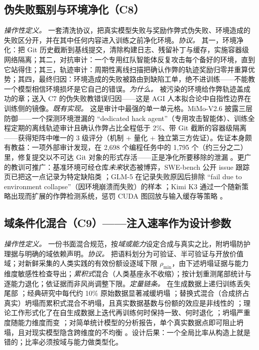 \documentclass[10pt,fontset=fandol]{ctexart}
\begin{document}
\subsection{伪失败甄别与环境净化（C8）}

\emph{操作性定义。} 一套清洗协议，把真实模型失败与奖励作弊式伪失败、环境造成的失败区分开，并在其中任何内容进入训练之前净化环境。\emph{协议。} 其一，环境净化：把 Git 历史截断到基线提交，清除构建日志、残留补丁与缓存，实施容器级网络隔离；其二，对抗审计：一个专用红队智能体反复攻击每个备好的环境，直到它站得住；其三，轨迹审计：周期性离线扫描把确认作弊的轨迹奖励归零并重算优势；其四，最终归因：环境造成的失败被路由到缺陷工单，绝不进训练——不能教一个模型相信环境损坏是它自己的错误。\emph{为什么。} 被污染的环境给作弊轨迹盖成功的章；送入 C7 的伪失败教错误归因——这是 AGI 人本拟合论中自指性边界在训练侧的镜像。\emph{既有实现。} 这是审计中最强的单一单元格。MiMo-V2.6 披露三层防御——一个探测环境泄漏的 ``dedicated hack agent''（专用攻击智能体）、训练全程定期的离线轨迹审计且确认作弊占比全程低于 2\%、带 Git 截断的容器级隔离 \cite{ref26}——获得矩阵中唯一的 3 级评分（机制 + 量化 + 独立第三方佐证）。佐证本身颇有教益：一项外部审计发现，在 2,698 个编程任务中的 1,795 个（约三分之二）里，修复提交以不可达 Git 对象的形式存活——正是净化所要移除的泄漏 \cite{ref29}。更广的教训可推广：基准环境可经仓库\emph{未来}状态被博弈，SWE-bench 公开 issue 跟踪页已把这一点记录为特定缺陷类 \cite{ref30}；GLM-5 在记录失败原因后排除 ``fail due to environment collapse''（因环境崩溃而失败）的样本 \cite{ref27}；Kimi K3 通过一个随新策略出现而扩展的作弊检测系统，惩罚 CUDA 图回放与输入缓存等策略 \cite{ref31}。

\subsection{域条件化混合（C9）——注入速率作为设计参数}

\emph{操作性定义。} 一份书面混合规范，按\emph{域或能力}设定合成与真实之比，附坍塌防护理据与明确的域依赖声明。\emph{协议。} 把语料划分为可验证、半可验证与开放价值域；对新鲜采集的人类实践的有效份额设逐域下限 $\rho_{\min}$，由下述坍塌证据与能力维度敏感性检查导出；\emph{累积式}混合（人类基座永不收缩）；按计划重测尾部统计与逐能力退化；依证据而非风尚调整下限。\emph{定量链条。} 在生成数据上递归训练丢失尾部 \cite{ref4}；经典研究中每代约 10\% 原始数据显著减缓坍塌 \cite{ref4}；替换式混合（合成挤占真实）坍塌而累积式混合不坍塌，且真实数据基数与份额的效应是非线性的 \cite{ref32}；理论工作形式化了在自生成数据上迭代再训练何时保持一致、何时退化 \cite{ref33}；坍塌严重度随能力维度而变 \cite{ref34}；对简单统计模型的分析报告，单个真实数据点即可阻止坍塌，且对现实模型隐含跨维度的不均衡 \cite{ref35}。设计后果：一个全局比率从构造上就是错的；比率必须按域与能力做类型化。
\end{document}
